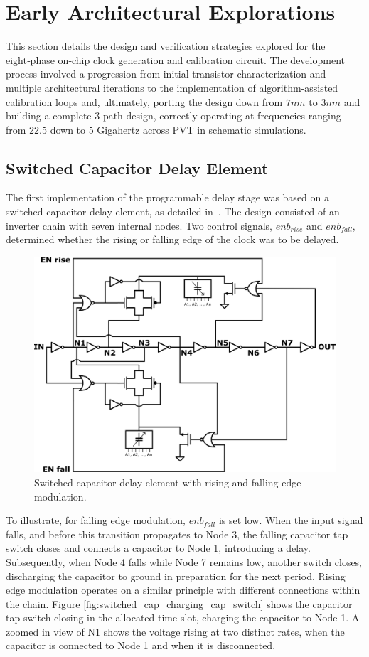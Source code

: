 \section{Early Architectural Explorations}\label{sec:methodology}

This section details the design and verification strategies explored for the eight‑phase on‑chip clock generation and calibration circuit. The development process involved a progression from initial transistor characterization and multiple architectural iterations to the implementation of algorithm-assisted calibration loops and, ultimately, porting the design down from $7nm$ to $3nm$ and building a complete 3-path design, correctly operating at frequencies ranging from 22.5 down to 5 Gigahertz across PVT in schematic simulations.

\subsection{Switched Capacitor Delay Element}\label{sec:switched_cap}

The first implementation of the programmable delay stage was based on a switched capacitor delay element, as detailed in~\cite{Ramazanoglu2018switched}. The design consisted of an inverter chain with seven internal nodes. Two control signals, $enb_{rise}$ and $enb_{fall}$, determined whether the rising or falling edge of the clock was to be delayed.

\begin{figure}
  \centering
  \includegraphics[width=0.7\linewidth]{figures/Schematics/switch_cap_SCI.png}
  \caption{Switched capacitor delay element with rising and falling edge modulation.}
  \label{fig:switched_cap_delay_element}
\end{figure}

To illustrate, for falling edge modulation, $enb_{fall}$ is set low. When the input signal falls, and before this transition propagates to Node 3, the falling capacitor tap switch closes and connects a capacitor to Node 1, introducing a delay. Subsequently, when Node 4 falls while Node 7 remains low, another switch closes, discharging the capacitor to ground in preparation for the next period. Rising edge modulation operates on a similar principle with different connections within the chain. Figure \ref{fig:switched_cap_charging_cap_switch} shows the capacitor tap switch closing in the allocated time slot, charging the capacitor to Node 1. A zoomed in view of N1 shows the voltage rising at two distinct rates, when the capacitor is connected to Node 1 and when it is disconnected.

